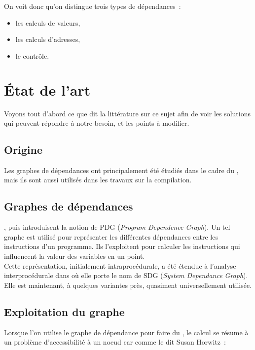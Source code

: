 On voit donc qu'on distingue trois types de dépendances~:
\begin{itemize}
\item les calculs de valeurs,
\item les calculs d'adresses,
 \item le contrôle.
\end{itemize}


\section{État de l'art}\label{sec-lart}

Voyons tout d'abord ce que dit la littérature sur ce sujet
afin de voir les solutions qui peuvent répondre à notre besoin,
et les points à modifier.

\subsection{Origine}

Les graphes de dépendances ont principalement été étudiés dans le cadre du
\slicing{}, mais ils sont aussi utilisés dans les travaux sur la compilation.

\subsection{Graphes de dépendances}

\cite{Ottenstein84}, puis \cite{Ferrante87}
introduisent la notion de PDG ({\it Program Dependence Graph}).
Un tel graphe est utilisé pour représenter les différentes dépendances
entre les instructions d'un programme.
Ils l'exploitent pour calculer les instructions
qui influencent la valeur des variables en un point.\\

Cette représentation, initialement intraprocédurale, a été étendue
à l'analyse interprocédurale dans \cite{horwitz88interprocedural} où elle
porte le nom de SDG ({\it System Dependance Graph}).
Elle est maintenant, à quelques variantes près,
quasiment universellement utilisée.

\subsection{Exploitation du graphe}

Lorsque l'on utilise le graphe de dépendance pour faire du \slicing,
le calcul se résume à un problème d'accessibilité à un noeud car comme le dit
Susan Horwitz~:

